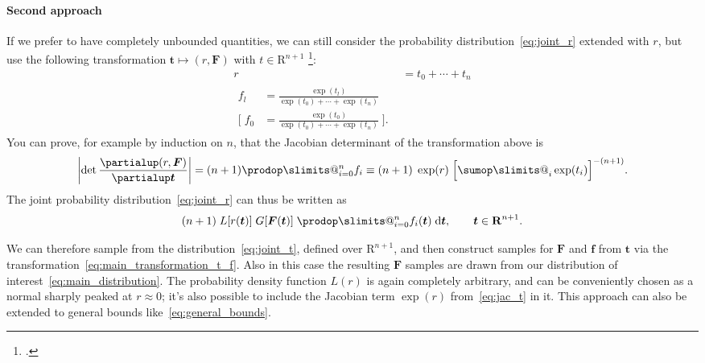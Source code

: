 \documentclass[\ifafour a4paper,12pt,\else a5paper,10pt,\fi%
onecolumn,oneside,article,%
british%
]{memoir}
\makeatletter
\theoremstyle{remark}
\theoremstyle{innote}
\def\sum{\DOTSI\sumop\slimits@}
\def\prod{\DOTSI\prodop\slimits@}
\newcommand*{\citep}{\footcites}
\newcommand*{\de}{\partialup}%
\newcommand*{\di}{\mathrm{d}}%
\newcommand*{\RR}{\bm{\mathrm{R}}}
\DeclarePairedDelimiter\abs{\lvert}{\rvert}
\renewcommand*{\|}[1][]{\nonscript\,#1\vert\nonscript\;\mathopen{}}
\newcommand*{\sect}{\S}%
\newcommand*{\cf}{{cf.}}
\newcommand*{\tsum}{\mathop{\textstyle\sum}\nolimits}
\newcommand*{\yff}{f}
\newcommand*{\yf}{\bm{\yff}}
\newcommand*{\yfi}{\bm{F}}
\newcommand*{\yg}{G}
\newcommand*{\yh}{L}
\newcommand*{\ytt}{t}
\newcommand*{\yt}{\bm{\ytt}}
\makeatother
\begin{document}

\paragraph{Second approach}
If we prefer to have completely unbounded quantities, we can still consider
the probability distribution~\eqref{eq:joint_r} extended with $r$, but use
the following transformation $\yt \mapsto (r,\yfi)$ with $t \in \RR^{n+1}$
\citep[\cf][\sect~23.5, p.~316]{mackay1995_r2003}:
\begin{subequations}
  \label{eq:main_transformation_t}
  \begin{align}
      \label{eq:main_transformation_t_r}
    r&= \ytt_{0} + \dotsb + \ytt_{n} \\
      \label{eq:main_transformation_t_f}
    \begin{split}
    \yff_{l}&= \frac{\exp(\ytt_{l})}{\exp(\ytt_{0}) + \dotsb + \exp(\ytt_{n})} 
    \\
  \biggl[\;  \yff_{0}&= \frac{\exp(\ytt_{0})}{\exp(\ytt_{0}) + \dotsb + \exp(\ytt_{n})} \;\biggr].
    \end{split}
  \end{align}
\end{subequations}
You can prove, for example by induction on $n$, that the Jacobian determinant of
the transformation above is
\begin{equation}
  \label{eq:jac_t}
  \abs*{\det\frac{\de(r,\yfi)}{\de\yt}} =
  (n+1)\prod_{i=0}^{n}\yff_{i} \equiv
  (n+1)\;\exp(r)\; \Bigl[\tsum_{i}\exp(\ytt_{i})\Bigr]^{-(n+1)} .
\end{equation}
The joint probability distribution~\eqref{eq:joint_r} can thus be written as
\begin{equation}
  \label{eq:joint_t}
  (n+1)\;\yh[r(\yt)]\;\yg[\yfi(\yt)]\;\prod_{i=0}^{n}\yff_{i}(\yt)\;\di\yt,
  \qquad \yt \in \RR^{n+1}.
\end{equation}

We can therefore sample from the distribution~\eqref{eq:joint_t}, defined
over $\RR^{n+1}$, and then construct samples for $\yfi$ and $\yf$ from
$\yt$ via the transformation~\eqref{eq:main_transformation_t_f}. Also in
this case the resulting $\yfi$ samples are drawn from our distribution of
interest~\eqref{eq:main_distribution}. The probability density function
$\yh(r)$ is again completely arbitrary, and can be conveniently chosen as a
normal sharply peaked at $r\approx 0$; it's also possible to include the
Jacobian term $\exp(r)$ from~\eqref{eq:jac_t} in it. This approach can also
be extended to general bounds like~\eqref{eq:general_bounds}.
\end{document}
